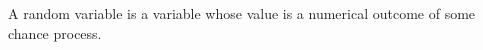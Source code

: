 \documentclass[preview]{standalone}
\begin{document}
\begin{center}
A random variable is a variable whose value is a numerical outcome of some chance process.
\end{center}
\end{document}
